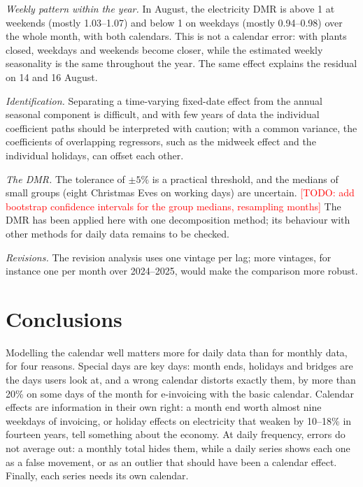 \documentclass[Afour, times]{sagej}
\newcommand{\todo}[1]{\textcolor{red}{[TODO: #1]}}
\begin{document}
\textit{Weekly pattern within the year.} In August, the electricity DMR is above 1 at weekends (mostly 1.03--1.07) and below 1 on weekdays (mostly 0.94--0.98) over the whole month, with both calendars. This is not a calendar error: with plants closed, weekdays and weekends become closer, while the estimated weekly seasonality is the same throughout the year. The same effect explains the residual on 14 and 16 August.

\textit{Identification.} Separating a time-varying fixed-date effect from the annual seasonal component is difficult, and with few years of data the individual coefficient paths should be interpreted with caution; with a common variance, the coefficients of overlapping regressors, such as the midweek effect and the individual holidays, can offset each other.

\textit{The DMR.} The tolerance of $\pm5\%$ is a practical threshold, and the medians of small groups (eight Christmas Eves on working days) are uncertain. \todo{add bootstrap confidence intervals for the group medians, resampling months} The DMR has been applied here with one decomposition method; its behaviour with other methods for daily data \cite{ollech2021,proietti2023} remains to be checked.

\textit{Revisions.} The revision analysis uses one vintage per lag; more vintages, for instance one per month over 2024--2025, would make the comparison more robust.

\section{Conclusions}
\label{sec:conclusions}

Modelling the calendar well matters more for daily data than for monthly data, for four reasons. Special days are key days: month ends, holidays and bridges are the days users look at, and a wrong calendar distorts exactly them, by more than 20\% on some days of the month for e-invoicing with the basic calendar. Calendar effects are information in their own right: a month end worth almost nine weekdays of invoicing, or holiday effects on electricity that weaken by 10--18\% in fourteen years, tell something about the economy. At daily frequency, errors do not average out: a monthly total hides them, while a daily series shows each one as a false movement, or as an outlier that should have been a calendar effect. Finally, each series needs its own calendar.
\end{document}
